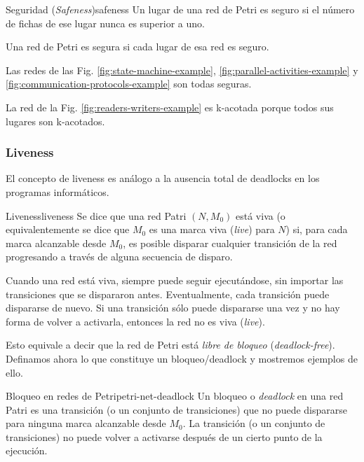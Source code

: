 \begin{definition}{Seguridad (\textit{Safeness})}{safeness}
      Un lugar de una red de Petri es seguro si el número de fichas de ese lugar nunca es
      superior a uno.

      Una red de Petri es segura si cada lugar de esa red es seguro.
\end{definition}

Las redes de las Fig. \ref{fig:state-machine-example}, \ref{fig:parallel-activities-example}
y \ref{fig:communication-protocols-example} son todas seguras.

La red de la Fig. \ref{fig:readers-writers-example} es k-acotada porque todos sus lugares son k-acotados.

\subsubsection{Liveness}

El concepto de liveness es análogo a la ausencia total de deadlocks en los programas informáticos.

\begin{definition}{Liveness}{liveness}
      Se dice que una red Patri $(N, M_0)$ está viva (o equivalentemente se dice que $M_0$ es una
      marca viva (\textit{live}) para $N$) si, para cada marca alcanzable desde $M_0$, es posible disparar
      cualquier transición de la red progresando a través de alguna secuencia de disparo.
\end{definition}

Cuando una red está viva, siempre puede seguir ejecutándose, sin importar las transiciones que
se dispararon antes. Eventualmente, cada transición puede dispararse de nuevo. Si una
transición sólo puede dispararse una vez y no hay forma de volver a activarla, entonces la red
no es viva (\textit{live}).

Esto equivale a decir que la red de Petri está \emph{libre de bloqueo} (\textit{deadlock-free}).
Definamos ahora lo que constituye un bloqueo/deadlock y mostremos ejemplos de ello.

\begin{definition}{Bloqueo en redes de Petri}{petri-net-deadlock}
      Un bloqueo o \textit{deadlock} en una red Patri es una transición (o un conjunto de transiciones) que
      no puede dispararse para ninguna marca alcanzable desde $M_0$. La transición (o un
      conjunto de transiciones) no puede volver a activarse después de un cierto punto de la
      ejecución.
\end{definition}

